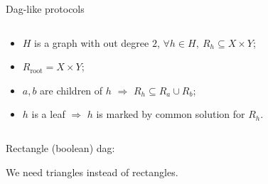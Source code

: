 \begin{frame}{Dag-like protocols}
    \vspace{-0.8cm}
    \begin{columns}[t]
        \begin{column}{0.58\textwidth}
            \begin{itemize}
                \item $H$ is a graph with out degree $2$, $\forall h \in H, ~ R_h \subseteq X \times Y$;
                \item $R_{\mathrm{root}} = X \times Y$;
                \item $a, b$ are children of $h$ $\Rightarrow$ $R_{h} \subseteq R_{a} \cup R_{b}$;
                \item $h$ is a leaf $\Rightarrow$ $h$ is marked by common solution for $R_h$.
            \end{itemize}
        \end{column}

		\begin{column}{0.38\textwidth}
            \begin{center}
                
            \end{center}
		\end{column}
	\end{columns}

    \pause
    \begin{center}
        Rectangle (boolean) dag:
        
        \vspace{0.2cm}
        
    \end{center}

    We need \alert{triangles} instead of rectangles.

\end{frame}

